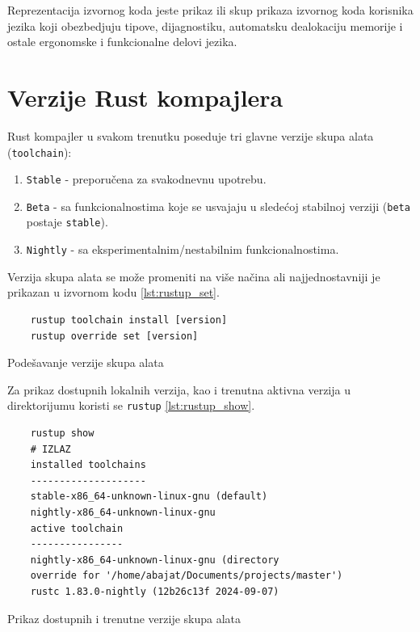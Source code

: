 \documentclass[11pt]{article}
\begin{document}
Reprezentacija izvornog koda jeste prikaz ili skup prikaza izvornog koda korisnika jezika koji obezbedjuju tipove, dijagnostiku,
automatsku dealokaciju memorije i ostale ergonomske i funkcionalne delovi jezika.
\newpage

\section{Verzije Rust kompajlera}

Rust kompajler u svakom trenutku poseduje tri glavne verzije skupa alata (\verb|toolchain|):

\begin{enumerate}
    \item \verb|Stable| - preporučena za svakodnevnu upotrebu. 
    \item \verb|Beta| - sa funkcionalnostima koje se usvajaju u sledećoj stabilnoj verziji (\verb|beta| postaje \verb|stable|).
    \item \verb|Nightly| - sa eksperimentalnim/nestabilnim funkcionalnostima. 
\end{enumerate}

Verzija skupa alata se može promeniti na više načina ali najjednostavniji je prikazan u izvornom kodu \ref{lst:rustup_set}.

\begin{listing}[H]
\begin{verbatim}
    rustup toolchain install [version]
    rustup override set [version]
\end{verbatim}
\caption{Podešavanje verzije skupa alata}
\label{lst:rustup_set}
\end{listing}

Za prikaz dostupnih lokalnih verzija, kao i trenutna aktivna verzija u direktorijumu koristi se \verb|rustup| \ref{lst:rustup_show}.

\begin{listing}[H]
\begin{verbatim}
    rustup show
    # IZLAZ
    installed toolchains
    --------------------
    stable-x86_64-unknown-linux-gnu (default)
    nightly-x86_64-unknown-linux-gnu
    active toolchain
    ----------------
    nightly-x86_64-unknown-linux-gnu (directory 
    override for '/home/abajat/Documents/projects/master')
    rustc 1.83.0-nightly (12b26c13f 2024-09-07)
\end{verbatim}
\caption{Prikaz dostupnih i trenutne verzije skupa alata}
\label{lst:rustup_show}
\end{listing}
\end{document}
